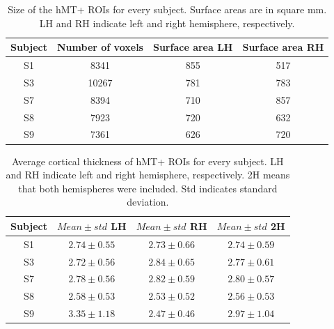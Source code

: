 \begin{table}[htbp!]
\centering
\caption{Size of the hMT+ ROIs for every subject. Surface areas are in square mm. LH and RH indicate left and right hemisphere, respectively.}
\begin{tabular}{cccc}
Subject & Number of voxels & Surface area LH & Surface area RH
\\
\midrule
S1 & 8341 & 855 & 517\\
S3 & 10267 & 781 & 783\\
S7 & 8394 & 710 & 857\\
S8 & 7923 & 720 & 632\\
S9 & 7361 & 626 & 720\\
\bottomrule
\end{tabular}
\label{tab:rois}
\end{table}

\begin{table}[htbp!]
\centering
\caption{Average cortical thickness of hMT+ ROIs for every subject. LH and RH indicate left and right hemisphere, respectively. 2H means that both hemispheres were included. Std indicates standard deviation.}
\begin{tabular}{cccc}
Subject & $Mean\pm std$ LH & $Mean\pm std$ RH & $Mean\pm std$ 2H 
\\
\midrule
S1 & $2.74\pm0.55$ &  $2.73\pm0.66$ &  $2.74\pm0.59$\\
S3 & $2.72\pm0.56$ &  $2.84\pm0.65$ &  $2.77\pm0.61$\\
S7 & $2.78\pm0.56$ &  $2.82\pm0.59$ &  $2.80\pm0.57$\\
S8 & $2.58\pm0.53$ &  $2.53\pm0.52$ &  $2.56\pm0.53$\\
S9 & $3.35\pm1.18$ &  $2.47\pm0.46$ &  $2.97\pm1.04$\\
\bottomrule
\end{tabular}
\label{tab:thickness}
\end{table}

